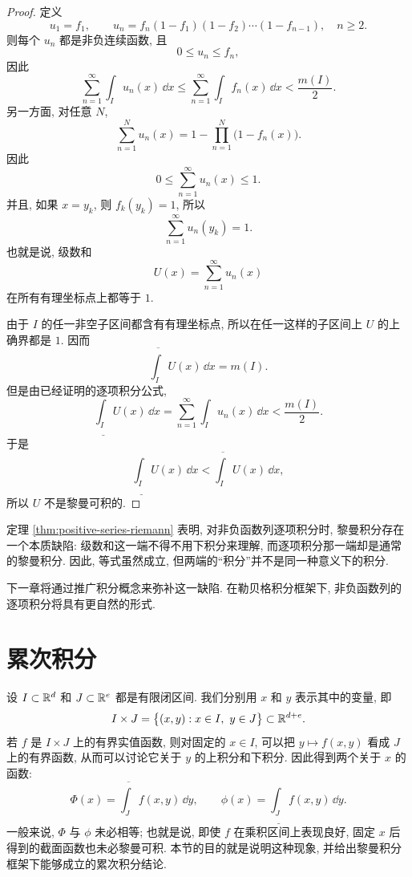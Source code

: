 \begin{proof}
	定义
	\[
	u_1=f_1,
	\qquad
	u_n=f_n(1-f_1)(1-f_2)\cdots(1-f_{n-1}),
	\quad n\geq 2.
	\]
	则每个 \(u_n\) 都是非负连续函数, 且
	\[
	0\leq u_n\leq f_n,
	\]
	因此
	\[
	\sum_{n=1}^{\infty}\int_I u_n(x)\,\dd x
	\leq
	\sum_{n=1}^{\infty}\int_I f_n(x)\,\dd x
	<
	\frac{m(I)}{2}.
	\]
	另一方面, 对任意 \(N\),
	\[
	\sum_{n=1}^{N}u_n(x)
	=
	1-\prod_{n=1}^{N}\bigl(1-f_n(x)\bigr).
	\]
	因此
	\[
	0\leq \sum_{n=1}^{\infty}u_n(x)\leq 1.
	\]
	并且, 如果 \(x=y_k\), 则 \(f_k(y_k)=1\), 所以
	\[
	\sum_{n=1}^{\infty}u_n(y_k)=1.
	\]
	也就是说, 级数和
	\[
	U(x)=\sum_{n=1}^{\infty}u_n(x)
	\]
	在所有有理坐标点上都等于 \(1\).
	
	由于 \(I\) 的任一非空子区间都含有有理坐标点, 所以在任一这样的子区间上 \(U\) 的上确界都是 \(1\). 因而
	\[
	\overline{\int_I}U(x)\,\dd x=m(I).
	\]
	但是由已经证明的逐项积分公式,
	\[
	\underline{\int_I}U(x)\,\dd x
	=
	\sum_{n=1}^{\infty}\int_I u_n(x)\,\dd x
	<
	\frac{m(I)}{2}.
	\]
	于是
	\[
	\underline{\int_I}U(x)\,\dd x
	<
	\overline{\int_I}U(x)\,\dd x,
	\]
	所以 \(U\) 不是黎曼可积的.
\end{proof}

\begin{rem}
	\label{rem:riemann-defect-positive-series}
	定理 \ref{thm:positive-series-riemann} 表明, 对非负函数列逐项积分时, 黎曼积分存在一个本质缺陷: 级数和这一端不得不用下积分来理解, 而逐项积分那一端却是通常的黎曼积分. 因此, 等式虽然成立, 但两端的“积分”并不是同一种意义下的积分.
	
	下一章将通过推广积分概念来弥补这一缺陷. 在勒贝格积分框架下, 非负函数列的逐项积分将具有更自然的形式.
\end{rem}

\clearpage

\section{累次积分}
\label{sec:iterated-riemann-integrals}

设 \(I\subset\mathbb{R}^d\) 和 \(J\subset\mathbb{R}^e\) 都是有限闭区间. 我们分别用 \(x\) 和 \(y\) 表示其中的变量, 即
\[
I\times J=\bigl\{(x,y):x\in I,\ y\in J\bigr\}\subset\mathbb{R}^{d+e}.
\]
若 \(f\) 是 \(I\times J\) 上的有界实值函数, 则对固定的 \(x\in I\), 可以把
\(y\mapsto f(x,y)\) 看成 \(J\) 上的有界函数, 从而可以讨论它关于 \(y\) 的上积分和下积分. 因此得到两个关于 \(x\) 的函数:
\[
\Phi(x)=\overline{\int_J} f(x,y)\,\dd y,
\qquad
\phi(x)=\underline{\int_J} f(x,y)\,\dd y.
\]
一般来说, \(\Phi\) 与 \(\phi\) 未必相等; 也就是说, 即使 \(f\) 在乘积区间上表现良好, 固定 \(x\) 后得到的截面函数也未必黎曼可积. 本节的目的就是说明这种现象, 并给出黎曼积分框架下能够成立的累次积分结论.

